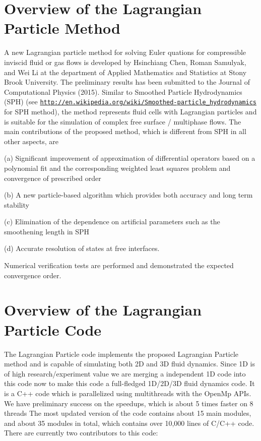\hypertarget{index_sec1}{}\section{Overview of the Lagrangian Particle Method}\label{index_sec1}
A new Lagrangian particle method for solving Euler quations for compressible inviscid fluid or gas flows is developed by Hsinchiang Chen, Roman Samulyak, and Wei Li at the department of Applied Mathematics and Statistics at Stony Brook University. The preliminary results has been submitted to the Journal of Computational Physics (2015). Similar to Smoothed Particle Hydrodynamics (S\-P\-H) (see \href{http://en.wikipedia.org/wiki/Smoothed-particle_hydrodynamics}{\tt http\-://en.\-wikipedia.\-org/wiki/\-Smoothed-\/particle\-\_\-hydrodynamics} for S\-P\-H method), the method represents fluid cells with Lagrangian particles and is suitable for the simulation of complex free surface / multiphase flows. The main contributions of the proposed method, which is different from S\-P\-H in all other aspects, are\par
(a) Significant improvement of approximation of differential operators based on a polynomial fit and the corresponding weighted least squares problem and convergence of prescribed order\par
 (b) A new particle-\/based algorithm which provides both accuracy and long term stability\par
 (c) Elimination of the dependence on artificial parameters such as the smoothening length in S\-P\-H\par
 (d) Accurate resolution of states at free interfaces.\par
Numerical verification tests are performed and demonstrated the expected convergence order.\par
 \hypertarget{index_sec2}{}\section{Overview of the Lagrangian Particle Code}\label{index_sec2}
The Lagrangian Particle code implements the proposed Lagrangian Particle method and is capable of simulating both 2\-D and 3\-D fluid dynamics. Since 1\-D is of high research/experiment value we are merging a independent 1\-D code into this code now to make this code a full-\/fledged 1\-D/2\-D/3\-D fluid dynamics code. It is a C++ code which is parallelized using multithreads with the Open\-Mp A\-P\-Is. We have preliminary success on the speedups, which is about 5 times faster on 8 threads The most updated version of the code contains about 15 main modules, and about 35 modules in total, which contains over 10,000 lines of C/\-C++ code. There are currently two contributors to this code\-:\par
